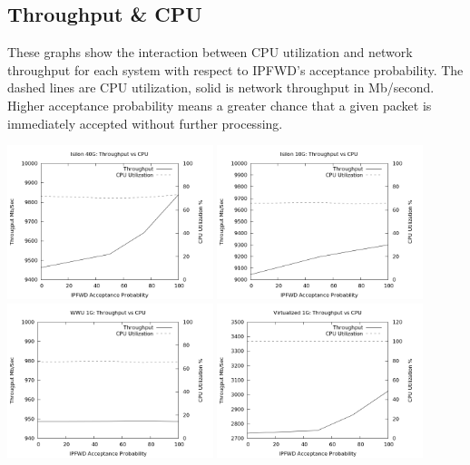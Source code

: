 \documentclass[journal]{IEEEtran}
\begin{document}
  \subsection{Throughput \& CPU}
  These graphs show the interaction between CPU utilization and network throughput for each system with respect to IPFWD's acceptance probability. The dashed lines are CPU utilization, solid is network throughput in Mb/second. Higher acceptance probability means a greater chance that a given packet is immediately accepted without further processing.
  
  \begin{center}
  \includegraphics[width=0.45\textwidth]{cpu_isilon40}
  \includegraphics[width=0.45\textwidth]{cpu_isilon10}
  \includegraphics[width=0.45\textwidth]{cpu_wwu1}
  \includegraphics[width=0.45\textwidth]{cpu_virtual10}
  \end{center}
\end{document}
